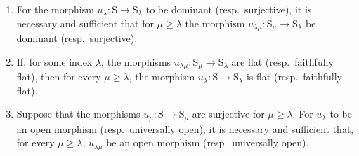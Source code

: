 \begin{proposition}[8.3.8]
\label{IV.8.3.8}
\begin{enumerate}[label=(\roman*)]
  \item For the morphism $u_\lambda:\mathrm{S}\to\mathrm{S}_\lambda$ to be dominant (resp.\ surjective), it is necessary and sufficient that for $\mu\geqslant\lambda$ the morphism $u_{\lambda\mu}:\mathrm{S}_\mu\to\mathrm{S}_\lambda$ be dominant (resp.\ surjective).
  \item If, for some index $\lambda$, the morphisms $u_{\lambda\mu}:\mathrm{S}_\mu\to\mathrm{S}_\lambda$ are flat (resp.\ faithfully flat), then for every $\mu\geqslant\lambda$, the morphism $u_\lambda:\mathrm{S}\to\mathrm{S}_\lambda$ is flat (resp.\ faithfully flat).
  \item Suppose that the morphisms $u_\mu:\mathrm{S}\to\mathrm{S}_\mu$ are surjective for $\mu\geqslant\lambda$.
For $u_\lambda$ to be an open morphism (resp.\ universally open), it is necessary and sufficient that, for every $\mu\geqslant\lambda$, $u_{\lambda\mu}$ be an open morphism (resp.\ universally open).
\end{enumerate}
\end{proposition}

